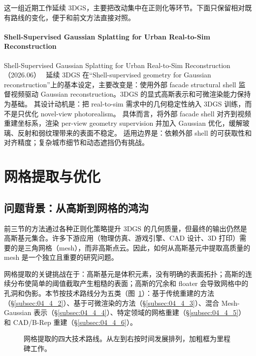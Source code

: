 这一组近期工作延续 3DGS，主要把改动集中在正则化等环节。下面只保留相对既有路线的变化，便于和前文方法直接对照。

\paragraph{Shell-Supervised Gaussian Splatting for Urban Real-to-Sim Reconstruction}
Shell-Supervised Gaussian Splatting for Urban Real-to-Sim Reconstruction（2026.06）~\cite{2606_30014} 延续 3DGS 在“Shell-supervised geometry for Gaussian reconstruction”上的基本设定，主要改变是：使用外部 facade structural shell 监督视频驱动 Gaussian reconstruction。3DGS 的显式高斯表示和可微渲染能力保持为基础。
其设计动机是：把 real-to-sim 需求中的几何稳定性纳入 3DGS 训练，而不是只优化 novel-view photorealism。
具体而言，将外部 facade shell 对齐到视频重建坐标系，渲染 per-view geometry supervision 并加入 Gaussian 优化，缓解玻璃、反射和弱纹理带来的表面不稳定。
适用边界是：依赖外部 shell 的可获取性和对齐精度；复杂城市细节和动态遮挡仍有挑战。
\section{网格提取与优化}
\label{sec:04_4}

\subsection{问题背景：从高斯到网格的鸿沟}

前三节的方法通过各种正则化策略提升 3DGS 的几何质量，但最终的输出仍然是高斯基元集合。许多下游应用（物理仿真、游戏引擎、CAD 设计、3D 打印）需要的是三角网格（mesh），而非高斯点云。因此，如何从高斯基元中提取高质量的 mesh 是一个独立且重要的研究问题。

网格提取的关键挑战在于：高斯基元是体积元素，没有明确的表面拓扑；高斯的连续分布使简单的阈值截取产生粗糙的表面；高斯的冗余和 floater 会导致网格中的孔洞和伪影。本节按技术路线分为五类（图~\ref{fig:04_mesh}）：基于传统重建的方法（\S\ref{subsec:04_4_2}）、基于可微渲染的方法（\S\ref{subsec:04_4_3}）、混合 Mesh-Gaussian 表示（\S\ref{subsec:04_4_4}）、特定领域的网格重建（\S\ref{subsec:04_4_5}）和 CAD/B-Rep 重建（\S\ref{subsec:04_4_6}）。

\begin{figure}[htbp]
\centering
\resizebox{0.95\textwidth}{!}{}
\caption{网格提取的四大技术路线。从左到右按时间发展排列，加粗框为里程碑工作。}
\label{fig:04_mesh}
\end{figure}

